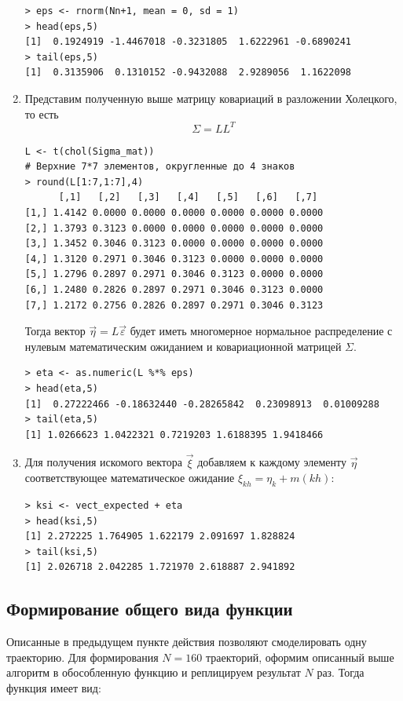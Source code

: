 \documentclass[14pt,a4paper]{scrartcl}
\begin{document}
\begin{enumerate}
\begin{verbatim}
> eps <- rnorm(Nn+1, mean = 0, sd = 1)
> head(eps,5)
[1]  0.1924919 -1.4467018 -0.3231805  1.6222961 -0.6890241
> tail(eps,5)
[1]  0.3135906  0.1310152 -0.9432088  2.9289056  1.1622098
\end{verbatim}

	\item Представим полученную выше матрицу ковариаций в разложении Холецкого, то есть
	\begin{equation*}
		\Sigma = LL^T
	\end{equation*}

\begin{verbatim}
L <- t(chol(Sigma_mat))
# Верхние 7*7 элементов, округленные до 4 знаков
> round(L[1:7,1:7],4) 
      [,1]   [,2]   [,3]   [,4]   [,5]   [,6]   [,7]
[1,] 1.4142 0.0000 0.0000 0.0000 0.0000 0.0000 0.0000
[2,] 1.3793 0.3123 0.0000 0.0000 0.0000 0.0000 0.0000
[3,] 1.3452 0.3046 0.3123 0.0000 0.0000 0.0000 0.0000
[4,] 1.3120 0.2971 0.3046 0.3123 0.0000 0.0000 0.0000
[5,] 1.2796 0.2897 0.2971 0.3046 0.3123 0.0000 0.0000
[6,] 1.2480 0.2826 0.2897 0.2971 0.3046 0.3123 0.0000
[7,] 1.2172 0.2756 0.2826 0.2897 0.2971 0.3046 0.3123
\end{verbatim}
	
	Тогда вектор $\overrightarrow{\eta} = L\overrightarrow{\varepsilon}$ будет иметь многомерное нормальное распределение с нулевым математическим ожиданием и ковариационной матрицей $\Sigma$.

\begin{verbatim}
> eta <- as.numeric(L %*% eps)
> head(eta,5)
[1]  0.27222466 -0.18632440 -0.28265842  0.23098913  0.01009288
> tail(eta,5)
[1] 1.0266623 1.0422321 0.7219203 1.6188395 1.9418466
\end{verbatim}
	
	\item Для получения искомого вектора $\overrightarrow{\xi}$ добавляем к каждому элементу $\overrightarrow{\eta}$ соответствующее математическое ожидание $\xi_{kh} = \eta_{k} + m(kh)$:
	
\begin{verbatim}
> ksi <- vect_expected + eta
> head(ksi,5)
[1] 2.272225 1.764905 1.622179 2.091697 1.828824
> tail(ksi,5)
[1] 2.026718 2.042285 1.721970 2.618887 2.941892
\end{verbatim}
\end{enumerate}	
\pagebreak

\subsection*{Формирование общего вида функции}	
Описанные в предыдущем пункте действия позволяют смоделировать одну траекторию. Для формирования $N = 160$ траекторий, оформим описанный выше алгоритм в обособленную функцию и реплицируем результат $N$ раз. Тогда функция имеет вид:
\end{document}
